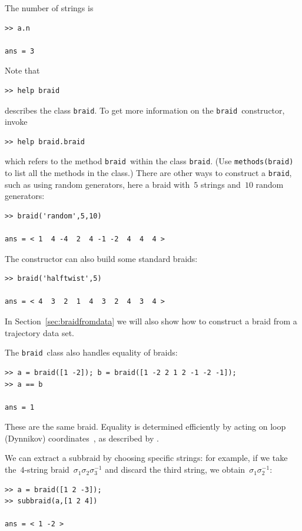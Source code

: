 \documentclass[12pt]{article}
\newcommand{\braid}{\texttt{braid}}%
\begin{document}
The number of strings is
\begin{lstlisting}[frame=single,framerule=0pt]
>> a.n

ans = 3
\end{lstlisting}
Note that
\begin{lstlisting}[frame=single,framerule=0pt]
>> help braid
\end{lstlisting}
describes the class \braid.  To get more information on the \braid\
constructor, invoke
\begin{lstlisting}[frame=single,framerule=0pt]
>> help braid.braid
\end{lstlisting}
which refers to the method \braid\ within the class \braid.  (Use
\lstinline{methods(braid)} to list all the methods in the class.)
There are other ways to construct a \braid, such as using random
generators, here a braid with~$5$ strings and~$10$ random generators:
\begin{lstlisting}[frame=single,framerule=0pt]
>> braid('random',5,10)

ans = < 1  4 -4  2  4 -1 -2  4  4  4 >
\end{lstlisting}
The constructor can also build some standard braids:
\begin{lstlisting}[frame=single,framerule=0pt]
>> braid('halftwist',5)

ans = < 4  3  2  1  4  3  2  4  3  4 >
\end{lstlisting}
In Section~\ref{sec:braidfromdata} we will also show how to construct
a braid from a trajectory data set.

The \braid\ class also handles equality of braids:
\begin{lstlisting}[frame=single,framerule=0pt]
>> a = braid([1 -2]); b = braid([1 -2 2 1 2 -1 -2 -1]);
>> a == b

ans = 1
\end{lstlisting}
These are the same braid.  Equality is determined efficiently by
acting on loop (Dynnikov) coordinates~\citep{Dynnikov2002}, as
described by \citet{Dehornoy2008}.

We can extract a subbraid by choosing specific strings: for example,
if we take the~$4$-string braid~$\sigma_1\sigma_2\sigma_3^{-1}$ and
discard the third string, we obtain~$\sigma_1\sigma_2^{-1}$:
\begin{lstlisting}[frame=single,framerule=0pt]
>> a = braid([1 2 -3]);
>> subbraid(a,[1 2 4])

ans = < 1 -2 >
\end{lstlisting}
\end{document}
